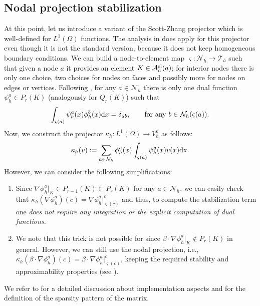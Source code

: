 \subsection{Nodal projection stabilization}

At this point, let us introduce a variant of the Scott-Zhang projector \cite{scott_finite_1990} which is well-defined for $L^1(\Omega)$ functions. The analysis in \cite{scott_finite_1990} does apply for this projector even though it is not the standard version, because it does not keep homogeneous boundary conditions. We can build a node-to-element map $\varsigma: \mathcal{N}_h \rightarrow  \mathcal{T}_h$ such that given a node $a$ it provides an element $K \in \mathcal{A}_h^{\rm el}(a)$; for interior nodes there is only one choice, two choices for nodes on faces and possibly more for nodes on edges or vertices. Following \cite{scott_finite_1990}, for any $a \in \mathcal{N}_h$ there is only one dual function $\psi^a_h \in P_r(K)$ (analogously for $Q_r(K)$) such that
\begin{align}\label{eq-dualfunct}
\int_{\varsigma(a)} \psi_h^a(x)\phi_h^b(x) {\rm d}x = \delta_{ab}, \qquad \hbox{for any}\ b\in\mathcal{N}_h(\varsigma(a)).
\end{align}
Now, we construct the projector $\kappa_h: L^1(\Omega) \rightarrow V^k_h$ as follows:
\begin{align}\label{eq-projSZ}
\kappa_h(v) := \sum_{a \in \mathcal{N}_h}  \phi^a_h(x) \int_{\varsigma(a)} \psi_h^a(x) v(x) \rm{d} x.\end{align} 
However, we can consider the following simplifications:
\begin{enumerate}
\item Since $\nabla \phi^a_h|_K \in P_{r-1}(K) \subset P_r(K)$ for any $a \in \mathcal{N}_h$, we can easily check that $\kappa_h(\nabla \phi^a_h)(c) =  \nabla \phi^a_h|^c_ {\varsigma(c)}$ and thus, to compute the stabilization term  one \emph{does not require any integration or the explicit computation of dual functions.} 
\item We note that this trick is not possible for  since $\beta \cdot \nabla \phi^a_h|_K \not\in P_{r}(K)$ in general. However, we can still use the nodal projection, i.e., $\kappa_h(\beta \cdot \nabla \phi^a_h)(c) =  \beta \cdot \nabla \phi^a_h|^c_ {\varsigma(c)}$, keeping the required stability and approximability properties (see \cite{rebollo_high_2013}).
\end{enumerate}
We refer to \cite{badia_stabilized_2012} for a detailed discussion about implementation aspects and for the definition of the sparsity pattern of the matrix. 

